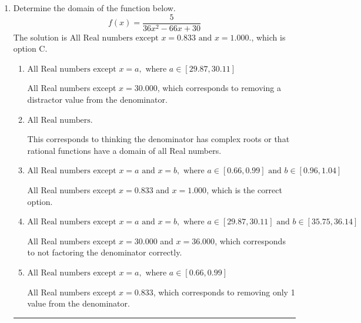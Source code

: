 \documentclass{extbook}[14pt]
\newcommand{\litem}[1]{\item #1

\rule{\textwidth}{0.4pt}}
\begin{document}
\begin{enumerate}\litem{
Determine the domain of the function below.
\[ f(x) = \frac{5}{36x^{2} -66 x + 30} \]The solution is \( \text{All Real numbers except } x = 0.833 \text{ and } x = 1.000. \), which is option C.\begin{enumerate}[label=\Alph*.]
\item \( \text{All Real numbers except } x = a, \text{ where } a \in [29.87, 30.11] \)

All Real numbers except $x = 30.000$, which corresponds to removing a distractor value from the denominator.
\item \( \text{All Real numbers.} \)

This corresponds to thinking the denominator has complex roots or that rational functions have a domain of all Real numbers.
\item \( \text{All Real numbers except } x = a \text{ and } x = b, \text{ where } a \in [0.66, 0.99] \text{ and } b \in [0.96, 1.04] \)

All Real numbers except $x = 0.833$ and $x = 1.000$, which is the correct option.
\item \( \text{All Real numbers except } x = a \text{ and } x = b, \text{ where } a \in [29.87, 30.11] \text{ and } b \in [35.75, 36.14] \)

All Real numbers except $x = 30.000$ and $x = 36.000$, which corresponds to not factoring the denominator correctly.
\item \( \text{All Real numbers except } x = a, \text{ where } a \in [0.66, 0.99] \)

All Real numbers except $x = 0.833$, which corresponds to removing only 1 value from the denominator.
\end{enumerate}

}
\end{enumerate}
\end{document}
